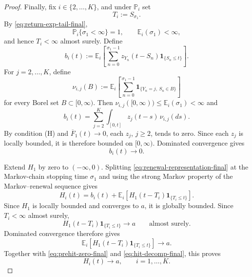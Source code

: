 \documentclass[10pt,a4paper]{amsart}
\newcommand{\E}{\mathbb E}
\newcommand{\Pbb}{\mathbb P}
\newcommand{\ind}[1]{\mathbf 1_{\{#1\}}}
\begin{document}
\begin{proof}
Finally, fix \(i\in\{2,\dots,K\}\), and under \(\Pbb_i\) set
\[
  T_i:=S_{\sigma_1}.
\]
By \eqref{eq:return-exp-tail-final},
\[
  \Pbb_i\{\sigma_1<\infty\}=1,
  \qquad
  \E_i(\sigma_1)<\infty,
\]
and hence \(T_i<\infty\) almost surely. Define
\[
  b_i(t):=
  \E_i\left[
    \sum_{n=0}^{\sigma_1-1}
    z_{Y_n}(t-S_n)\ind{S_n\le t}
  \right].
\]
For \(j=2,\dots,K\), define
\[
  \nu_{i,j}(B):=
  \E_i\left[
    \sum_{n=0}^{\sigma_1-1}
    \ind{Y_n=j,\ S_n\in B}
  \right]
\]
for every Borel set \(B\subset[0,\infty)\). Then
\(
  \nu_{i,j}([0,\infty))
  \le
  \E_i(\sigma_1)
  <\infty
\)
and
\[
  b_i(t)
  =
  \sum_{j=2}^K
  \int_{[0,t]}z_j(t-s)\,\nu_{i,j}(ds).
\]
By condition \textup{(H)} and \(\overline F_1(t)\to0\), each \(z_j\), \(j\ge2\), tends to zero. Since each \(z_j\) is locally bounded, it is therefore bounded on \([0,\infty)\). Dominated convergence gives
\begin{equation}\label{eq:prehit-zero-final}
  b_i(t)\longrightarrow0.
\end{equation}

Extend \(H_1\) by zero to \((-\infty,0)\). Splitting \eqref{eq:renewal-representation-final} at the Markov-chain stopping time \(\sigma_1\) and using the strong Markov property of the Markov--renewal sequence gives
\begin{equation}\label{eq:hit-decomp-final}
  H_i(t)
  =
  b_i(t)
  +
  \E_i\left[
    H_1(t-T_i)\ind{T_i\le t}
  \right].
\end{equation}
Since \(H_1\) is locally bounded and converges to \(a\), it is globally bounded. Since \(T_i<\infty\) almost surely,
\[
  H_1(t-T_i)\ind{T_i\le t}
  \longrightarrow a
  \qquad\text{almost surely}.
\]
Dominated convergence therefore gives
\[
  \E_i\left[
    H_1(t-T_i)\ind{T_i\le t}
  \right]
  \longrightarrow a.
\]
Together with \eqref{eq:prehit-zero-final} and \eqref{eq:hit-decomp-final}, this proves
\[
  H_i(t)\longrightarrow a,
  \qquad i=1,\dots,K.
\]
\end{proof}
\end{document}
